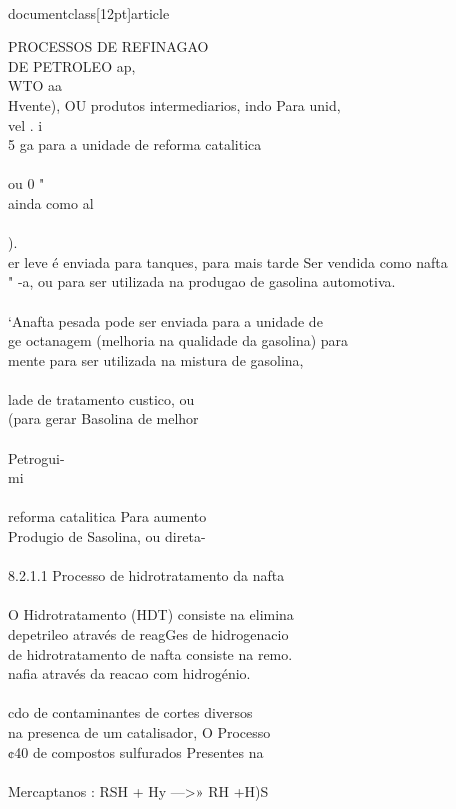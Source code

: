 \\documentclass[12pt]{article}
\begin{document}
PROCESSOS DE REFINAGAO\\
DE PETROLEO ap,\\
WTO aa\\
Hvente), OU produtos intermediarios, indo Para unid,\\
vel . i\\
5 ga para a unidade de reforma catalitica\\
\\
ou 0 "\\
ainda como al\\
\\
).\\
er leve é enviada para tanques, para mais tarde Ser vendida como nafta\\
" -a, ou para ser utilizada na produgao de gasolina automotiva.\\
\\
‘Anafta pesada pode ser enviada para a unidade de\\
ge octanagem (melhoria na qualidade da gasolina) para\\
mente para ser utilizada na mistura de gasolina,\\
\\
lade de tratamento custico, ou\\
(para gerar Basolina de melhor\\
\\
Petrogui-\\
mi\\
\\
reforma catalitica Para aumento\\
Produgio de Sasolina, ou direta-\\
\\
8.2.1.1 Processo de hidrotratamento da nafta\\
\\
O Hidrotratamento (HDT) consiste na elimina\\
depetrileo através de reagGes de hidrogenacio\\
de hidrotratamento de nafta consiste na remo.\\
nafia através da reacao com hidrogénio.\\
\\
cdo de contaminantes de cortes diversos\\
na presenca de um catalisador, O Processo\\
¢40 de compostos sulfurados Presentes na\\
\\
Mercaptanos : RSH + Hy —>» RH +H)S\\
\end{document}
